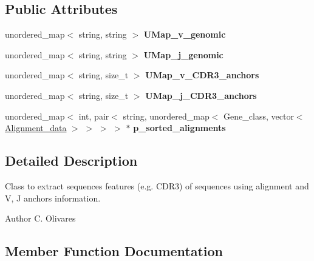 \subsection*{Public Attributes}
\begin{DoxyCompactItemize}
\item 
\mbox{\label{classExtractFeatures_aa67318cf2f9b155b533a4ab816fdd8ee}} 
unordered\+\_\+map$<$ string, string $>$ {\bfseries U\+Map\+\_\+v\+\_\+genomic}
\item 
\mbox{\label{classExtractFeatures_adf3a835b87f9f274a9b29f830fb7c406}} 
unordered\+\_\+map$<$ string, string $>$ {\bfseries U\+Map\+\_\+j\+\_\+genomic}
\item 
\mbox{\label{classExtractFeatures_a11a5252b3e1bd2c12b816dbf3f1cff37}} 
unordered\+\_\+map$<$ string, size\+\_\+t $>$ {\bfseries U\+Map\+\_\+v\+\_\+\+C\+D\+R3\+\_\+anchors}
\item 
\mbox{\label{classExtractFeatures_af524e782f4053ae78c0d12374b6ae6f3}} 
unordered\+\_\+map$<$ string, size\+\_\+t $>$ {\bfseries U\+Map\+\_\+j\+\_\+\+C\+D\+R3\+\_\+anchors}
\item 
\mbox{\label{classExtractFeatures_a8f90e1dce7c28bc411cebfd72cd63257}} 
unordered\+\_\+map$<$ int, pair$<$ string, unordered\+\_\+map$<$ Gene\+\_\+class, vector$<$ \hyperlink{structAlignment__data}{Alignment\+\_\+data} $>$ $>$ $>$ $>$ $\ast$ {\bfseries p\+\_\+sorted\+\_\+alignments}
\end{DoxyCompactItemize}


\subsection{Detailed Description}
Class to extract sequences features (e.\+g. C\+D\+R3) of sequences using alignment and V, J anchors information. 

\begin{DoxyAuthor}{Author}
C. Olivares 
\end{DoxyAuthor}


\subsection{Member Function Documentation}
\mbox{\label{classExtractFeatures_af1dc5d4f1cb7e15227fbafcd2df662d2}} 
